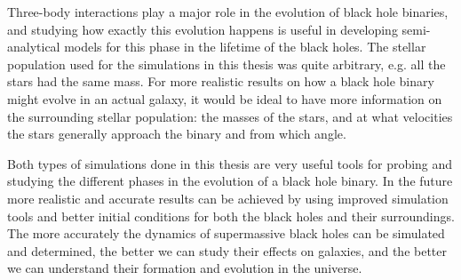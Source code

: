 \documentclass[english, oneside]{HYgradu}
\begin{document}
Three-body interactions play a major role in the evolution of black hole binaries, and studying how exactly this evolution happens is useful in developing semi-analytical models for this phase in the lifetime of the black holes. The stellar population used for the simulations in this thesis was quite arbitrary, e.g. all the stars had the same mass. For more realistic results on how a black hole binary might evolve in an actual galaxy, it would be ideal to have more information on the surrounding stellar population: the masses of the stars, and at what velocities the stars generally approach the binary and from which angle. 

Both types of simulations done in this thesis are very useful tools for probing and studying the different phases in the evolution of a black hole binary. In the future more realistic and accurate results can be achieved by using improved simulation tools and better initial conditions for both the black holes and their surroundings. The more accurately the dynamics of supermassive black holes can be simulated and determined, the better we can study their effects on galaxies, and the better we can understand their formation and evolution in the universe.


\clearpage
{} %

\small

\label{pagecount}
\end{document}
